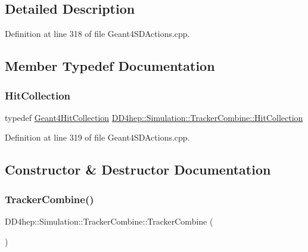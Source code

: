 \subsection{Detailed Description}


Definition at line 318 of file Geant4\+S\+D\+Actions.\+cpp.



\subsection{Member Typedef Documentation}
\hypertarget{struct_d_d4hep_1_1_simulation_1_1_tracker_combine_ae776b8d22a42d425b4d9b6344ed430e1}{}\label{struct_d_d4hep_1_1_simulation_1_1_tracker_combine_ae776b8d22a42d425b4d9b6344ed430e1} 
\subsubsection{\texorpdfstring{Hit\+Collection}{HitCollection}}
{\footnotesize\ttfamily typedef \hyperlink{class_d_d4hep_1_1_simulation_1_1_geant4_hit_collection}{Geant4\+Hit\+Collection} \hyperlink{struct_d_d4hep_1_1_simulation_1_1_tracker_combine_ae776b8d22a42d425b4d9b6344ed430e1}{D\+D4hep\+::\+Simulation\+::\+Tracker\+Combine\+::\+Hit\+Collection}}



Definition at line 319 of file Geant4\+S\+D\+Actions.\+cpp.



\subsection{Constructor \& Destructor Documentation}
\hypertarget{struct_d_d4hep_1_1_simulation_1_1_tracker_combine_a60747607cdefc8283d864c6f5313a392}{}\label{struct_d_d4hep_1_1_simulation_1_1_tracker_combine_a60747607cdefc8283d864c6f5313a392} 
\subsubsection{\texorpdfstring{Tracker\+Combine()}{TrackerCombine()}}
{\footnotesize\ttfamily D\+D4hep\+::\+Simulation\+::\+Tracker\+Combine\+::\+Tracker\+Combine (\begin{DoxyParamCaption}{ }\end{DoxyParamCaption})\hspace{0.3cm}{\ttfamily [inline]}}




